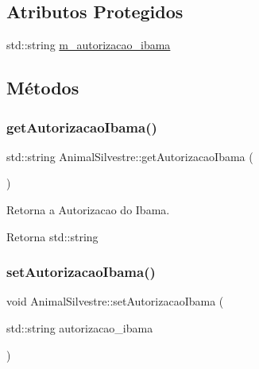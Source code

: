 \subsection*{Atributos Protegidos}
\begin{DoxyCompactItemize}
\item 
std\+::string \hyperlink{classAnimalSilvestre_a921c430fa2507062e3a2605599dd6735}{m\+\_\+autorizacao\+\_\+ibama}
\end{DoxyCompactItemize}


\subsection{Métodos}
\mbox{\label{classAnimalSilvestre_a040b1391d175d7572d11deddc7b3e8cb}} 
\subsubsection{\texorpdfstring{get\+Autorizacao\+Ibama()}{getAutorizacaoIbama()}}
{\footnotesize\ttfamily std\+::string Animal\+Silvestre\+::get\+Autorizacao\+Ibama (\begin{DoxyParamCaption}{ }\end{DoxyParamCaption})}



Retorna a Autorizacao do Ibama. 

\begin{DoxyReturn}{Retorna}
std\+::string 
\end{DoxyReturn}
\mbox{\label{classAnimalSilvestre_ae7c8a7c193ff93fafe05419ff1c5db18}} 
\subsubsection{\texorpdfstring{set\+Autorizacao\+Ibama()}{setAutorizacaoIbama()}}
{\footnotesize\ttfamily void Animal\+Silvestre\+::set\+Autorizacao\+Ibama (\begin{DoxyParamCaption}\item[{std\+::string}]{autorizacao\+\_\+ibama }\end{DoxyParamCaption})}



